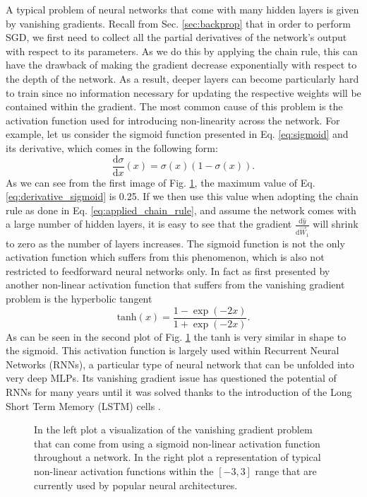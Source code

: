 A typical problem of neural networks that come with many hidden layers is given by vanishing gradients. Recall from Sec. \ref{sec:backprop} that in order to perform SGD, we first need to collect all the partial derivatives of the network's output with respect to its parameters. As we do this by applying the chain rule, this can have the drawback of making the gradient decrease exponentially with respect to the depth of the network. As a result, deeper layers can become particularly hard to train since no information necessary for updating the respective weights will be contained within the gradient. The most common cause of this problem is the activation function used for introducing non-linearity across the network. For example, let us consider the sigmoid function presented in Eq. \ref{eq:sigmoid} and its derivative, which comes in the following form:
\begin{equation}
	\frac{\text{d}\sigma}{\text{d}x}(x) = \sigma(x)(1-\sigma(x)).
	\label{eq:derivative_sigmoid}
\end{equation}
As we can see from the first image of Fig. \ref{fig:activation_functions}, the maximum value of Eq. \ref{eq:derivative_sigmoid} is 0.25. If we then use this value when adopting the chain rule as done in Eq. \ref{eq:applied_chain_rule}, and assume the network comes with a large number of hidden layers, it is easy to see that the gradient $\frac{\text{d}\hat{y}}{\text{d}\vec{W}_1}$ will shrink to zero as the number of layers increases. The sigmoid function is not the only activation function which suffers from this phenomenon, which is also not restricted to feedforward neural networks only. In fact as first presented by \citet{hochreiter1997long} another non-linear activation function that suffers from the vanishing gradient problem is the hyperbolic tangent 
\begin{equation}
	\text{tanh}(x) = \frac{1-\exp(-2x)}{1+\exp(-2x)}.
\end{equation}
As can be seen in the second plot of Fig. \ref{fig:activation_functions} the tanh is very similar in shape to the sigmoid. This activation function is largely used within Recurrent Neural Networks (RNNs), a particular type of neural network that can be unfolded into very deep MLPs. Its vanishing gradient issue has questioned the potential of RNNs for many years until it was solved thanks to the introduction of the Long Short Term Memory (LSTM) cells \cite{hochreiter1997long}. 

\begin{figure}[ht!]
	\centering
	
	\caption{In the left plot a visualization of the vanishing gradient problem that can come from using a sigmoid non-linear activation function throughout a network. In the right plot a representation of typical non-linear activation functions within the $[-3,3]$ range that are currently used by popular neural architectures.}
\label{fig:activation_functions}
\end{figure}

